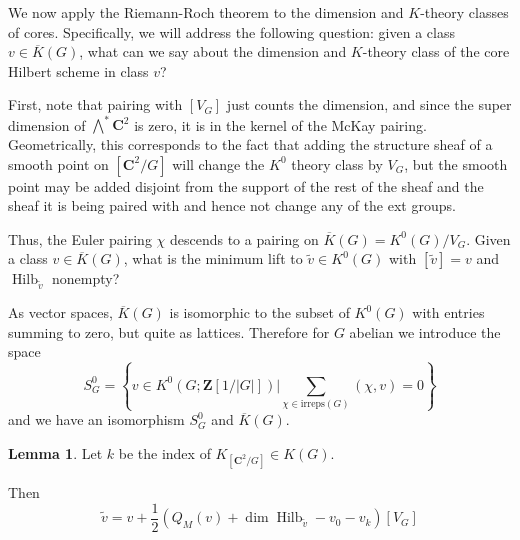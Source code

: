 \documentclass{amsart}[12pt]
\theoremstyle{definition}
\newtheorem{lemma}[dummy]{Lemma}
\newcommand{\Z}{\mathbf{Z}}
\newcommand{\C}{\mathbf{C}}
\newcommand{\irreps}{\text{irreps}}
\DeclareMathOperator{\Hilb}{Hilb}
\begin{document}
We now apply the Riemann-Roch theorem to the dimension and $K$-theory classes of cores.  Specifically, we will address the following question: given a class $v\in \overline{K}(G)$, what can we say about the dimension and $K$-theory class of the core Hilbert scheme in class $v$?

First, note that pairing with $[V_G]$ just counts the dimension, and since the super dimension of $\bigwedge^*\C^2$ is zero, it is in the kernel of the McKay pairing.  Geometrically, this corresponds to the fact that adding the structure sheaf of a smooth point on $[\C^2/G]$ will change the $K^0$ theory class by $V_G$, but the smooth point may be added disjoint from the support of the rest of the sheaf and the sheaf it is being paired with and hence not change any of the ext groups.


Thus, the Euler pairing $\chi$ descends to a pairing on $\overline{K}(G)=K^0(G)/V_G$.  Given a class $v\in \overline{K}(G)$, what is the minimum lift to $\tilde{v}\in K^0(G)$ with $[\tilde{v}]=v$ and $\Hilb_{\tilde{v}}$ nonempty?

As vector spaces, $\overline{K}(G)$ is isomorphic to the subset of $K^0(G)$ with entries summing to zero, but quite as lattices.  Therefore for $G$ abelian we introduce the space 
$$S^0_G=\left\{v\in K^0(G; \Z[1/|G|])\Bigg | \sum_{\chi\in\irreps(G)}(\chi, v)=0\right\}$$
and we have an isomorphism $S^0_G$ and $\overline{K}(G)$.  


\begin{lemma}
Let $k$ be the index of $K_{[\C^2/G]}\in K(G)$.

Then
$$\tilde{v}=v+\frac{1}{2}\left(Q_M(v)+\dim\Hilb_{\tilde{v}} -v_0-v_{k}\right)[V_G]$$
\end{lemma}
\end{document}
